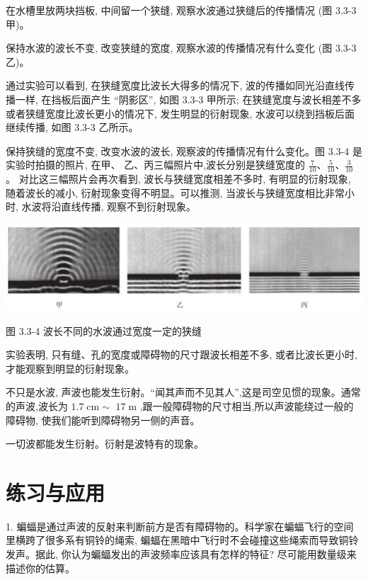 \documentclass[10pt]{article}
\begin{document}
在水槽里放两块挡板, 中间留一个狭缝, 观察水波通过狭缝后的传播情况 (图 3.3-3 甲)。

保持水波的波长不变, 改变狭缝的宽度, 观察水波的传播情况有什么变化 (图 3.3-3 乙)。

通过实验可以看到, 在狭缝宽度比波长大得多的情况下, 波的传播如同光沿直线传播一样, 在挡板后面产生 “阴影区”, 如图 3.3-3 甲所示; 在狭缝宽度与波长相差不多或者狭缝宽度比波长更小的情况下, 发生明显的衍射现象, 水波可以绕到挡板后面继续传播, 如图 3.3-3 乙所示。

保持狭缝的宽度不变, 改变水波的波长, 观察波的传播情况有什么变化。图 3.3-4 是实验时拍摄的照片, 在甲、 乙、丙三幅照片中,波长分别是狭缝宽度的 \(\frac{7}{10}\text{、}\frac{5}{10}\text{、}\frac{3}{10}\) 。 对比这三幅照片会再次看到, 波长与狭缝宽度相差不多时, 有明显的衍射现象, 随着波长的减小, 衍射现象变得不明显。可以推测, 当波长与狭缝宽度相比非常小时, 水波将沿直线传播, 观察不到衍射现象。

\begin{center}
\includegraphics[max width=1.0\textwidth]{images/01910e4c-ebb8-7d2c-8f2f-2375bc1d2d12_78_948725.jpg}
\end{center}

图 3.3-4 波长不同的水波通过宽度一定的狭缝

实验表明, 只有缝、孔的宽度或障碍物的尺寸跟波长相差不多, 或者比波长更小时, 才能观察到明显的衍射现象。

不只是水波, 声波也能发生衍射。“闻其声而不见其人”,这是司空见惯的现象。通常的声波,波长为 \({1.7}\mathrm{\;{cm}} \sim\) \({17}\mathrm{\;m}\) ,跟一般障碍物的尺寸相当,所以声波能绕过一般的障碍物, 使我们能听到障碍物另一侧的声音。

一切波都能发生衍射。衍射是波特有的现象。

\section*{练习与应用}

1. 蝙蝠是通过声波的反射来判断前方是否有障碍物的。科学家在蝙蝠飞行的空间里横跨了很多系有铜铃的绳索, 蝙蝠在黑暗中飞行时不会碰撞这些绳索而导致铜铃发声。据此, 你认为蝙蝠发出的声波频率应该具有怎样的特征? 尽可能用数量级来描述你的估算。
\end{document}
